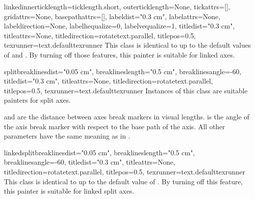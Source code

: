 \begin{classdesc}{linked}{innerticklength=ticklength.short,
                         outerticklength=None,
                         tickattrs=[],
                         gridattrs=None,
                         basepathattrs=[],
                         labeldist="0.3 cm",
                         labelattrs=None,
                         labeldirection=None,
                         labelhequalize=0,
                         labelvequalize=1,
                         titledist="0.3 cm",
                         titleattrs=None,
                         titledirection=rotatetext.parallel,
                         titlepos=0.5,
                         texrunner=text.defaulttexrunner}
  This class is identical to  up to the default values of
   and . By turning off those
  features, this painter is suitable for linked axes.
\end{classdesc}

\begin{classdesc}{split}{breaklinesdist="0.05 cm",
                         breaklineslength="0.5 cm",
                         breaklinesangle=-60,
                         titledist="0.3 cm",
                         titleattrs=None,
                         titledirection=rotatetext.parallel,
                         titlepos=0.5,
                         texrunner=text.defaulttexrunner}
  Instances of this class are suitable painters for split axes.

   and  are the distance
  between axes break markers in visual \PyX{} lengths.
   is the angle of the axis break marker with
  respect to the base path of the axis. All other parameters have the
  same meaning as in .
\end{classdesc}

\begin{classdesc}{linkedsplit}{breaklinesdist="0.05 cm",
                               breaklineslength="0.5 cm",
                               breaklinesangle=-60,
                               titledist="0.3 cm",
                               titleattrs=None,
                               titledirection=rotatetext.parallel,
                               titlepos=0.5,
                               texrunner=text.defaulttexrunner}
  This class is identical to  up to the default value of
  . By turning off this feature, this painter is
  suitable for linked split axes.
\end{classdesc}

